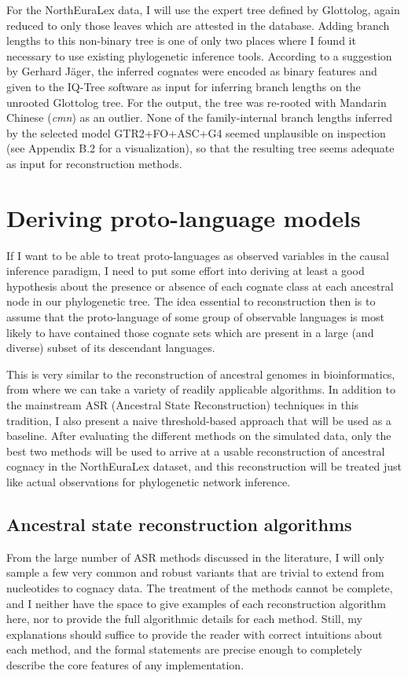 For the NorthEuraLex data, I will use the expert tree defined by Glottolog, again reduced to only those leaves which are attested in the database. Adding branch lengths to this non-binary tree is one of only two places where I found it necessary to use existing phylogenetic inference tools. According to a suggestion by Gerhard Jäger, the inferred cognates were encoded as binary features and given to the IQ-Tree software \citep{nguyen_ea_2015} as input for inferring branch lengths on the unrooted Glottolog tree. For the output, the tree was re-rooted with Mandarin Chinese (\textit{cmn}) as an outlier. None of the family-internal branch lengths inferred by the selected model GTR2+FO+ASC+G4 seemed unplausible on inspection (see Appendix B.2 for a visualization), so that the resulting tree seems adequate as input for reconstruction methods.

\section{Deriving proto-language models}\label{sec:6.7}
If I want to be able to treat proto-languages as observed variables in the causal inference paradigm, I need to put some effort into deriving at least a good hypothesis about the presence or absence of each cognate class at each ancestral node in our phylogenetic tree. The idea essential to reconstruction then is to assume that the proto-language of some group of observable languages is most likely to have contained those cognate sets which are present in a large (and diverse) subset of its descendant languages.

This is very similar to the reconstruction of ancestral genomes in bioinformatics, from where we can take a variety of readily applicable algorithms. In addition to the mainstream ASR (Ancestral State Reconstruction) techniques in this tradition, I also present a naive threshold-based approach that will be used as a baseline. After evaluating the different methods on the simulated data, only the best two methods will be used to arrive at a usable reconstruction of ancestral cognacy in the NorthEuraLex dataset, and this reconstruction will be treated just like actual observations for phylogenetic network inference.

\subsection{Ancestral state reconstruction algorithms}
From the large number of ASR methods discussed in the literature, I will only sample a few very common and robust variants that are trivial to extend from nucleotides to cognacy data. The treatment of the methods cannot be complete, and I neither have the space to give examples of each reconstruction algorithm here, nor to provide the full algorithmic details for each method. Still, my explanations should suffice to provide the reader with correct intuitions about each method, and the formal statements are precise enough to completely describe the core features of any implementation.

